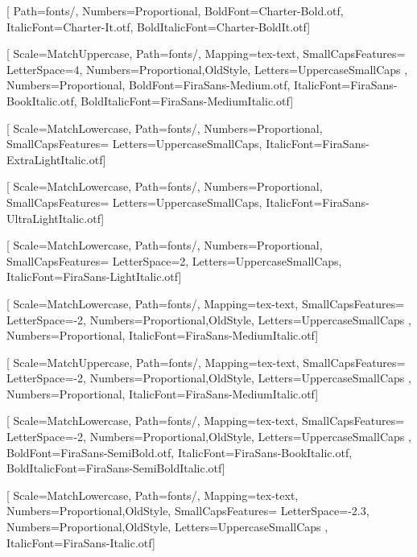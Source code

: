 \setmainfont{CHR55.otf}[
	Path=fonts/,
    Numbers={Proportional},
    BoldFont=Charter-Bold.otf,
    ItalicFont=Charter-It.otf,
    BoldItalicFont=Charter-BoldIt.otf]

\setsansfont{FiraSans-Book.otf}[
	Scale=MatchUppercase,
    Path=fonts/,
    Mapping=tex-text,
    SmallCapsFeatures={
    	LetterSpace=4,
    	Numbers={Proportional,OldStyle},
        Letters=UppercaseSmallCaps
        },
    Numbers={Proportional},
    BoldFont=FiraSans-Medium.otf,
    ItalicFont=FiraSans-BookItalic.otf,
    BoldItalicFont=FiraSans-MediumItalic.otf]

\newfontfamily{}[
	Scale=MatchLowercase,
    Path=fonts/,
    Numbers={Proportional},
    SmallCapsFeatures={
    	Letters=UppercaseSmallCaps},
    ItalicFont=FiraSans-ExtraLightItalic.otf]

\newfontfamily{}[
	Scale=MatchLowercase,
    Path=fonts/,
    Numbers={Proportional},
    SmallCapsFeatures={
    	Letters=UppercaseSmallCaps},
    ItalicFont=FiraSans-UltraLightItalic.otf]

\newfontfamily{}[
	Scale=MatchLowercase,
    Path=fonts/,
    Numbers={Proportional},
    SmallCapsFeatures={
    	LetterSpace=2,
    	Letters=UppercaseSmallCaps},
    ItalicFont=FiraSans-LightItalic.otf]

\newfontfamily{}[
	Scale=MatchLowercase,
    Path=fonts/,
    Mapping=tex-text,
    SmallCapsFeatures={
    	LetterSpace=-2,
    	Numbers={Proportional,OldStyle},
        Letters=UppercaseSmallCaps
        },
    Numbers={Proportional},
    ItalicFont=FiraSans-MediumItalic.otf]

\newfontfamily{}[
	Scale=MatchUppercase,
    Path=fonts/,
    Mapping=tex-text,
    SmallCapsFeatures={
    	LetterSpace=-2,
    	Numbers={Proportional,OldStyle},
        Letters=UppercaseSmallCaps
        },
    Numbers={Proportional},
    ItalicFont=FiraSans-MediumItalic.otf]

\newfontfamily{}[
	Scale=MatchLowercase,
    Path=fonts/,
    Mapping=tex-text,
    SmallCapsFeatures={
    	LetterSpace=-2,
    	Numbers={Proportional,OldStyle},
        Letters=UppercaseSmallCaps
        },
    BoldFont=FiraSans-SemiBold.otf,
    ItalicFont=FiraSans-BookItalic.otf,
    BoldItalicFont=FiraSans-SemiBoldItalic.otf]

\newfontfamily{}[
	Scale=MatchLowercase,
    Path=fonts/,
    Mapping=tex-text,
    Numbers={Proportional,OldStyle},
    SmallCapsFeatures={
    	LetterSpace=-2.3,
    	Numbers={Proportional,OldStyle},
        Letters=UppercaseSmallCaps
        },
    ItalicFont=FiraSans-Italic.otf]

